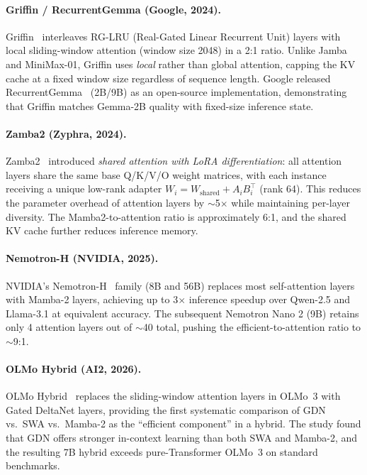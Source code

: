 \documentclass[11pt,a4paper]{article}
\begin{document}
\paragraph{Griffin / RecurrentGemma (Google, 2024).}
Griffin~\cite{de2024griffin} interleaves RG-LRU (Real-Gated Linear Recurrent Unit) layers with local sliding-window attention (window size 2048) in a 2:1 ratio. Unlike Jamba and MiniMax-01, Griffin uses \emph{local} rather than global attention, capping the KV cache at a fixed window size regardless of sequence length. Google released RecurrentGemma~\cite{botev2024recurrentgemma} (2B/9B) as an open-source implementation, demonstrating that Griffin matches Gemma-2B quality with fixed-size inference state.

\paragraph{Zamba2 (Zyphra, 2024).}
Zamba2~\cite{zyphra2024zamba2} introduced \emph{shared attention with LoRA differentiation}: all attention layers share the same base Q/K/V/O weight matrices, with each instance receiving a unique low-rank adapter $W_i = W_{\text{shared}} + A_i B_i^\top$ (rank 64). This reduces the parameter overhead of attention layers by $\sim$5$\times$ while maintaining per-layer diversity. The Mamba2-to-attention ratio is approximately 6:1, and the shared KV cache further reduces inference memory.

\paragraph{Nemotron-H (NVIDIA, 2025).}
NVIDIA's Nemotron-H~\cite{nvidia2025nemotronh} family (8B and 56B) replaces most self-attention layers with Mamba-2 layers, achieving up to 3$\times$ inference speedup over Qwen-2.5 and Llama-3.1 at equivalent accuracy. The subsequent Nemotron Nano 2 (9B) retains only 4 attention layers out of $\sim$40 total, pushing the efficient-to-attention ratio to $\sim$9:1.

\paragraph{OLMo Hybrid (AI2, 2026).}
OLMo Hybrid~\cite{ai2_2026_olmo_hybrid} replaces the sliding-window attention layers in OLMo~3 with Gated DeltaNet layers, providing the first systematic comparison of GDN vs.\ SWA vs.\ Mamba-2 as the ``efficient component'' in a hybrid. The study found that GDN offers stronger in-context learning than both SWA and Mamba-2, and the resulting 7B hybrid exceeds pure-Transformer OLMo~3 on standard benchmarks.
\end{document}
